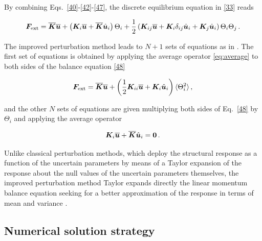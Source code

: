 \documentclass[preprint,12pt]{elsarticle}
\def    \obu {{\overline{\bu}}}
\def    \obK {{\overline{\bK}}}
\def    \hbu {{\hat{\bu}_i}}
\begin{document}
By combining Eqs.~\eqref{40}-\eqref{42}-\eqref{47}, the discrete equilibrium equation in \eqref{33} reads
\begin{linenomath}
\begin{equation}\label{48}
    \bF_{\rm ext} =
    \obK \obu 
    +
    \left( \bK_i \obu 
    +
    \obK
    \hbu \right) \Theta_i
    +
     \frac{1}{2} \left( 
    \bK_{ij} \obu + \bK_i  \delta_{ij}\hbu + \bK_j \hbu
    \right) \Theta_i \Theta_j \, .
\end{equation}
\end{linenomath}

The improved perturbation method leads to $N + 1$ sets of equations as in \cite{impollonia:2002}. The first set of equations is obtained by applying the average operator \eqref{eq:average} to both sides of the balance equation \eqref{48}
\begin{linenomath}
\begin{equation}\label{49}
    \bF_{\rm ext} =
    \obK \obu 
    +
    \left(
    \frac{1}{2} 
    \bK_{ii} \obu + \bK_i \hbu 
    \right) \langle \Theta_i^2 \rangle  \, ,
\end{equation}
\end{linenomath}
and the other $N$ sets of equations are given multiplying both sides of Eq.~\eqref{48} by $\Theta_i$ and applying the average operator 
\begin{linenomath}
\begin{equation}\label{50}
    \bK_i \obu 
    +
    \obK
    \hbu = \b0 \, .
\end{equation}
\end{linenomath}
Unlike classical perturbation methods, which deploy the structural response as a function of the uncertain parameters by means of a Taylor expansion of the response about the null values of the uncertain parameters themselves, the improved perturbation method Taylor expands directly the linear momentum balance equation seeking for a better approximation of the response in terms of mean and variance \cite{impollonia:2002}. 

\subsection{Numerical solution strategy}
\label{sec:numerics}
\end{document}
